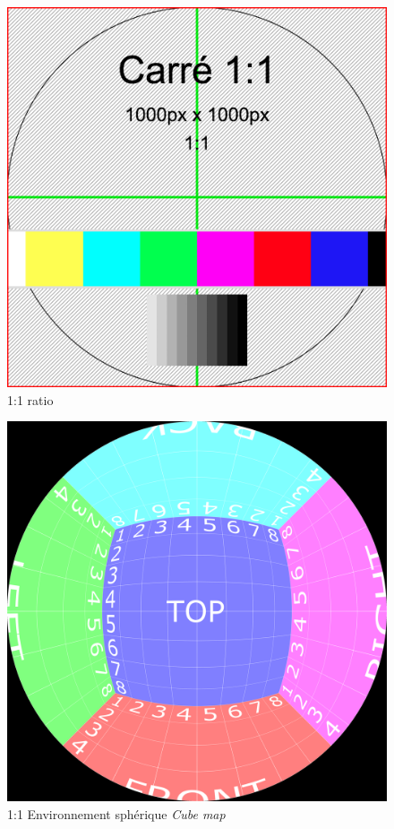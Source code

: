 \documentclass[
  french,
]{book}
\begin{document}
\begin{figure}
\centering
\includegraphics{medias/lexique/carre_1_1_1000x1000.png}
\caption{1:1 ratio}
\end{figure}

\begin{figure}
\centering
\includegraphics{medias/lexique/CubeMap_4096x4096.png}
\caption{1:1 Environnement sphérique \emph{Cube map}}
\end{figure}
\end{document}
